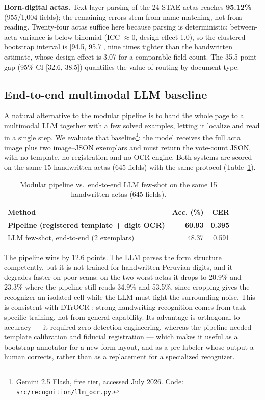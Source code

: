\documentclass[conference]{IEEEtran}
\begin{document}
\textbf{Born-digital actas.} Text-layer parsing of the 24 STAE actas reaches
\textbf{95.12\%} (955/1,004 fields); the remaining errors stem from
name matching, not from reading. Twenty-four actas suffice here because
parsing is deterministic: between-acta variance is below binomial
(ICC $\approx 0$, design effect 1.0), so the clustered bootstrap interval is
[94.5, 95.7], nine times tighter than the handwritten estimate, whose
design effect is 3.07 for a comparable field count. The 35.5-point gap
(95\% CI [32.6, 38.5]) quantifies the value of routing by document type.

\subsection{End-to-end multimodal LLM baseline}
\label{sec:llm}
A natural alternative to the modular pipeline is to hand the whole page to a
multimodal LLM together with a few solved examples, letting it localize and
read in a single step. We evaluate that baseline\footnote{Gemini 2.5 Flash,
free tier, accessed July 2026. Code: \texttt{src/recognition/llm\_ocr.py}.}:
the model receives the full acta image plus two image--JSON exemplars and must
return the vote-count JSON, with no template, no registration and no OCR
engine. Both systems are scored on the same 15 handwritten actas (645 fields)
with the same protocol (Table~\ref{tab:llm}).

\begin{table}[t]
\caption{Modular pipeline vs.\ end-to-end LLM few-shot on the same 15
handwritten actas (645 fields).}
\label{tab:llm}
\centering
\begin{tabular}{lrr}
\toprule
Method & Acc. (\%) & CER \\
\midrule
\textbf{Pipeline (registered template + digit OCR)} & \textbf{60.93} & \textbf{0.395} \\
LLM few-shot, end-to-end (2 exemplars) & 48.37 & 0.591 \\
\bottomrule
\end{tabular}
\end{table}

The pipeline wins by 12.6 points. The LLM parses the form structure
competently, but it is not trained for handwritten Peruvian digits, and it
degrades faster on poor scans: on the two worst actas it drops to 20.9\% and
23.3\% where the pipeline still reads 34.9\% and 53.5\%, since cropping gives
the recognizer an isolated cell while the LLM must fight the surrounding
noise. This is consistent with DTrOCR \cite{dtrocr}: strong handwriting
recognition comes from task-specific training, not from general capability.
Its advantage is orthogonal to accuracy --- it required zero detection
engineering, whereas the pipeline needed template calibration and fiducial
registration --- which makes it useful as a bootstrap annotator for a new
form layout, and as a pre-labeler whose output a human corrects, rather than
as a replacement for a specialized recognizer.
\end{document}
